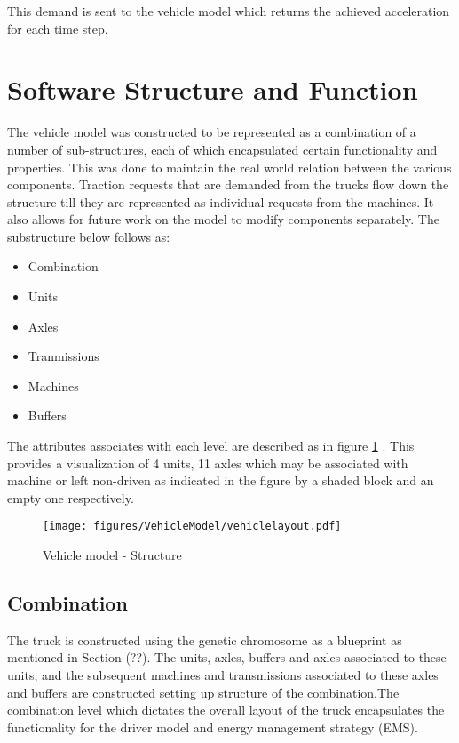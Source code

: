 \documentclass[MastersThesis.tex]{subfiles}
\begin{document}
This demand is sent to the vehicle model which returns the achieved acceleration for each time step.

\section{Software Structure and Function}
The vehicle model was constructed to be represented as a combination of a number of sub-structures, each of which encapsulated certain functionality and properties. This was done to maintain the real world relation between the various components. Traction requests that are demanded from the trucks flow down the structure till they are represented as individual requests from the machines. It also allows for future work on the model to modify components separately. The substructure below follows as:

\begin{itemize}
\item Combination
\item Units
\item Axles
\item Tranmissions
\item Machines
\item Buffers
\end{itemize}

The attributes associates with each level are described as in figure \ref{fig:vehiclelayout} . This provides a visualization of 4 units, 11 axles which may be associated with machine or left non-driven as indicated in the figure by a shaded block and an empty one respectively. 
\begin{figure}[ht!]
	\begin{center}
		\texttt{[image: figures/VehicleModel/vehiclelayout.pdf]}
	\end{center}
	\caption{Vehicle model - Structure}
	\label{fig:vehiclelayout}
\end{figure}

\subsection{Combination}\label{sec:combinationstructure}
The truck is constructed using the genetic chromosome as a blueprint as mentioned in Section (??). The units, axles, buffers and axles associated to these units, and the subsequent machines and transmissions associated to these axles and buffers are constructed setting up structure of the combination.The combination level which dictates the overall layout of the truck encapsulates the functionality for the driver model and energy management strategy (EMS).
\end{document}
